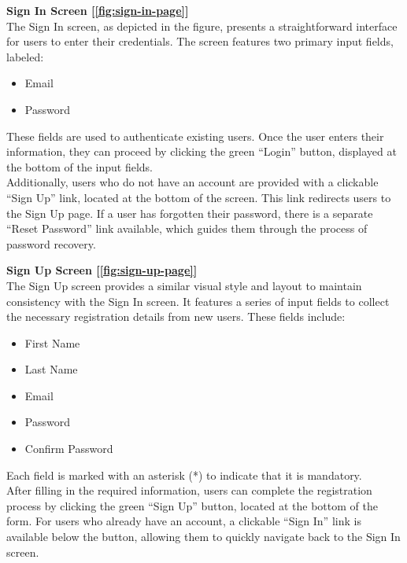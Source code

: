 \noindent \textbf{Sign In Screen [\ref{fig:sign-in-page}]} \\
The Sign In screen, as depicted in the figure, presents a straightforward interface for users to enter their credentials. The screen features two primary input fields, labeled:

\begin{itemize}
    \item Email
    \item Password
\end{itemize}

\noindent These fields are used to authenticate existing users. Once the user enters their information, they can proceed by clicking the green ``Login'' button, displayed at the bottom of the input fields.\vspace{5mm} \\
Additionally, users who do not have an account are provided with a clickable ``Sign Up'' link, located at the bottom of the screen. This link redirects users to the Sign Up page. If a user has forgotten their password, there is a separate ``Reset Password'' link available, which guides them through the process of password recovery.

\vspace{5mm}

\noindent \textbf{Sign Up Screen  [\ref{fig:sign-up-page}]} \\
The Sign Up screen provides a similar visual style and layout to maintain consistency with the Sign In screen. It features a series of input fields to collect the necessary registration details from new users. These fields include:

\begin{itemize}
    \item First Name
    \item Last Name
    \item Email
    \item Password
    \item Confirm Password
\end{itemize}

\noindent Each field is marked with an asterisk (*) to indicate that it is mandatory.\vspace{5mm} \\
After filling in the required information, users can complete the registration process by clicking the green ``Sign Up'' button, located at the bottom of the form. For users who already have an account, a clickable ``Sign In'' link is available below the button, allowing them to quickly navigate back to the Sign In screen.

